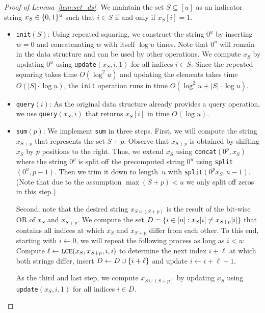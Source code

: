 \documentclass[10pt,a4paper]{article}
\DeclarePairedDelimiter\set{\lbrace}{\rbrace}
\newcommand\Oo{O}
\newcommand{\Op}[1]{{\normalfont\texttt{#1}}}
\begin{document}
\begin{proof}[Proof of {Lemma~\ref{lem:set_ds}}]
    We maintain the set $S\subseteq [u]$ as an indicator string $x_S \in \set{0,1}^{u}$ such that $i \in S$ if and only if $x_S[i] = 1$.
    \smallskip
    \begin{itemize}
        \setlength\parindent{1.5em}
        \item \Op{init}$(S)$: 
        Using repeated squaring, we construct the string $0^u$ by inserting $w=0$ and concatenating $w$ with itself $\log u$ times.
        Note that $0^u$ will remain in the data structure and can be used by other operations.
        We compute $x_S$ by updating $0^u$ using \Op{update}$(x_S, i, 1)$ for all indices $i \in S$.
        Since the repeated squaring takes time $\Oo(\log^2 u)$ and updating the elements takes time $\Oo(|S| \cdot \log u )$, the \Op{init} operation runs in time $\Oo(\log^2 u +|S| \cdot \log u )$.
        
        \item \Op{query}$(i)$: 
        As the original data structure already provides a query operation, we use \Op{query}$(x_S,i)$ that returns $x_S[i]$ in time $\Oo(\log u )$.

        \item \Op{sum}$(p)$: 
        We implement \Op{sum} in three steps.
        First, we will compute the string $x_{S+p}$ that represents the set $S +p$.
        Observe that $x_{S+p}$ is obtained by shifting $x_{S}$ by $p$ positions to the right.
        Thus, we extend $x_S$ using \Op{concat}$(0^{p}, x_S)$ where the string $0^p$ is split off the precomputed string $0^u$ using \Op{split}$(0^u,p-1)$.
        Then we trim it down to length~$u$ with \Op{split}$(0^{p} x_S, u-1)$. (Note that due to the assumption $\max(S + p) < u$ we only split off zeros in this step.)
        
        Second, note that the desired string $x_{S\cup (S+p)}$ is the result of the bit-wise OR of $x_S$ and $x_{S+p}$.
        We compute the set $D = \set{i \in [u] : x_S[i] \neq x_{S+p}[i]}$ that contains all indices at which $x_S$ and $x_{S+p}$ differ from each other.
        To this end, starting with $i \gets 0$, we will repeat the following process as long as $i < u$: Compute $\ell \leftarrow \Op{LCE}(x_S,x_{S+p},i,i)$ to determine the next index $i + \ell$ at which both strings differ, insert $D \leftarrow D \cup \set{i+\ell}$ and update $i \leftarrow i + \ell + 1$. 
        
        As the third and last step, we compute $x_{S\cup (S+p)}$ by updating $x_S$ using \Op{update}$(x_S, i, 1)$ for all indices $i \in D$.
        

\end{itemize}
\end{proof}
\end{document}
